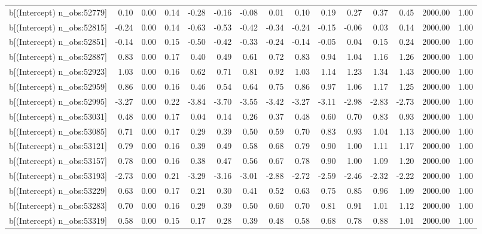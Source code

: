 \begin{table}[ht]
\begin{tabular}{rrrrrrrrrrrrrrr}
  b[(Intercept) n\_obs:52779] & 0.10 & 0.00 & 0.14 & -0.28 & -0.16 & -0.08 & 0.01 & 0.10 & 0.19 & 0.27 & 0.37 & 0.45 & 2000.00 & 1.00 \\ 
  b[(Intercept) n\_obs:52815] & -0.24 & 0.00 & 0.14 & -0.63 & -0.53 & -0.42 & -0.34 & -0.24 & -0.15 & -0.06 & 0.03 & 0.14 & 2000.00 & 1.00 \\ 
  b[(Intercept) n\_obs:52851] & -0.14 & 0.00 & 0.15 & -0.50 & -0.42 & -0.33 & -0.24 & -0.14 & -0.05 & 0.04 & 0.15 & 0.24 & 2000.00 & 1.00 \\ 
  b[(Intercept) n\_obs:52887] & 0.83 & 0.00 & 0.17 & 0.40 & 0.49 & 0.61 & 0.72 & 0.83 & 0.94 & 1.04 & 1.16 & 1.26 & 2000.00 & 1.00 \\ 
  b[(Intercept) n\_obs:52923] & 1.03 & 0.00 & 0.16 & 0.62 & 0.71 & 0.81 & 0.92 & 1.03 & 1.14 & 1.23 & 1.34 & 1.43 & 2000.00 & 1.00 \\ 
  b[(Intercept) n\_obs:52959] & 0.86 & 0.00 & 0.16 & 0.46 & 0.54 & 0.64 & 0.75 & 0.86 & 0.97 & 1.06 & 1.17 & 1.25 & 2000.00 & 1.00 \\ 
  b[(Intercept) n\_obs:52995] & -3.27 & 0.00 & 0.22 & -3.84 & -3.70 & -3.55 & -3.42 & -3.27 & -3.11 & -2.98 & -2.83 & -2.73 & 2000.00 & 1.00 \\ 
  b[(Intercept) n\_obs:53031] & 0.48 & 0.00 & 0.17 & 0.04 & 0.14 & 0.26 & 0.37 & 0.48 & 0.60 & 0.70 & 0.83 & 0.93 & 2000.00 & 1.00 \\ 
  b[(Intercept) n\_obs:53085] & 0.71 & 0.00 & 0.17 & 0.29 & 0.39 & 0.50 & 0.59 & 0.70 & 0.83 & 0.93 & 1.04 & 1.13 & 2000.00 & 1.00 \\ 
  b[(Intercept) n\_obs:53121] & 0.79 & 0.00 & 0.16 & 0.39 & 0.49 & 0.58 & 0.68 & 0.79 & 0.90 & 1.00 & 1.11 & 1.17 & 2000.00 & 1.00 \\ 
  b[(Intercept) n\_obs:53157] & 0.78 & 0.00 & 0.16 & 0.38 & 0.47 & 0.56 & 0.67 & 0.78 & 0.90 & 1.00 & 1.09 & 1.20 & 2000.00 & 1.00 \\ 
  b[(Intercept) n\_obs:53193] & -2.73 & 0.00 & 0.21 & -3.29 & -3.16 & -3.01 & -2.88 & -2.72 & -2.59 & -2.46 & -2.32 & -2.22 & 2000.00 & 1.00 \\ 
  b[(Intercept) n\_obs:53229] & 0.63 & 0.00 & 0.17 & 0.21 & 0.30 & 0.41 & 0.52 & 0.63 & 0.75 & 0.85 & 0.96 & 1.09 & 2000.00 & 1.00 \\ 
  b[(Intercept) n\_obs:53283] & 0.70 & 0.00 & 0.16 & 0.29 & 0.39 & 0.50 & 0.60 & 0.70 & 0.81 & 0.91 & 1.01 & 1.12 & 2000.00 & 1.00 \\ 
  b[(Intercept) n\_obs:53319] & 0.58 & 0.00 & 0.15 & 0.17 & 0.28 & 0.39 & 0.48 & 0.58 & 0.68 & 0.78 & 0.88 & 1.01 & 2000.00 & 1.00 \\ 

\end{tabular}
\end{table}
